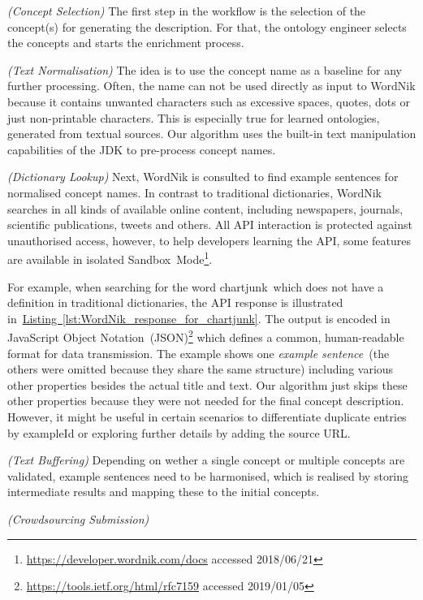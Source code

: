 \begin{enumerate}[label=\textbf{[Step \Roman*]},leftmargin=\widthof{[Step III]}+\labelsep]
	\item \emph{(Concept Selection)} The first step in the workflow is the selection of the concept(s)
	      for generating the description. For that, the ontology engineer selects the concepts and
		  starts the enrichment process. 
	\item \emph{(Text Normalisation)} The idea is to use the concept name as a baseline for any further
	      processing. Often, the name can not be used directly as input to WordNik because it
		  contains unwanted characters such as excessive spaces, quotes, dots or just non-printable
		  characters. This is especially true for learned ontologies, generated from textual sources.
		  Our algorithm uses the built-in text manipulation capabilities of the JDK to pre-process
		  concept names.
	\item \emph{(Dictionary Lookup)} Next, WordNik is consulted to find example sentences for normalised
	      concept names. In contrast to traditional dictionaries, WordNik searches in all kinds of available
		  online content, including newspapers, journals, scientific publications, tweets and others. All
		  API interaction is protected against unauthorised access, however, to help developers learning
		  the API, some features are available in isolated Sandbox~Mode\footnote{\url{https://developer.wordnik.com/docs} accessed  2018/06/21}.
		  
		  For example, when searching for the word \guillemotright chartjunk\guillemotleft~which does not
		  have a definition in traditional dictionaries, the API response is illustrated
		  in~\hyperref[lst:WordNik_response_for_chartjunk]{Listing~\ref*{lst:WordNik_response_for_chartjunk}}. The
		  output is encoded in JavaScript Object Notation~(JSON)\footnote{\url{https://tools.ietf.org/html/rfc7159} accessed 2019/01/05}
		  which defines a common, human-readable format for data transmission. The example shows one \emph{example
		  sentence}~(the others were omitted because they share the same structure) including various other
		  properties besides the actual title and text. Our algorithm just skips these other properties because they were
		  not needed for the final concept description. However, it might be useful in certain scenarios to differentiate 
		  duplicate entries by exampleId or exploring further details by adding the source URL.
	\item \emph{(Text Buffering)} Depending on wether a single concept or multiple concepts are validated, example sentences
	      need to be harmonised, which is realised by storing intermediate results and mapping these to the initial concepts.
	\item \emph{(Crowdsourcing Submission)} 
\end{enumerate}

